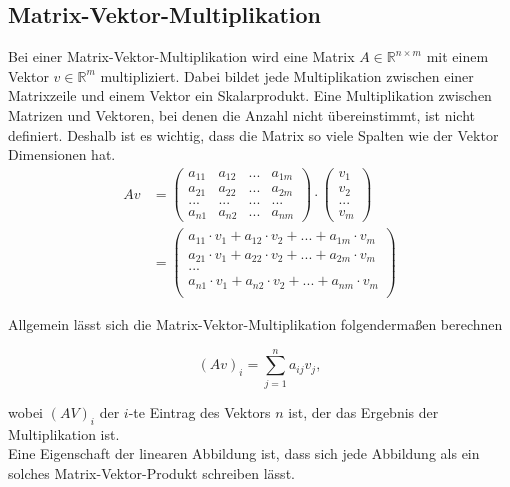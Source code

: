 \subsection{Matrix-Vektor-Multiplikation}
Bei einer Matrix-Vektor-Multiplikation wird eine Matrix $A \in  \mathbb{R}^{n \times m}$ mit einem Vektor $v \in \mathbb{R}^m$ multipliziert. Dabei bildet jede Multiplikation zwischen einer Matrixzeile und einem Vektor ein Skalarprodukt. Eine Multiplikation zwischen Matrizen und Vektoren, bei denen die Anzahl nicht übereinstimmt, ist nicht definiert. Deshalb ist es wichtig, dass die Matrix so viele Spalten wie der Vektor Dimensionen hat.
\begin{align*}
	Av &= 
	\left(
   \begin{array}{cccc}
	  a_{11} & a_{12} & ... & a_{1m}\\
		a_{21} & a_{22} & ... & a_{2m}\\
		...   & ...   & ... & ...  \\
		a_{n1} & a_{n2} & ... & a_{nm}
	 \end{array}
	\right) 
	\cdot 
	\left(
	 \begin{array}{c}
	  v_1\\
		v_2\\
		...\\
		v_m
	 \end{array}
	\right)\\
	&= \left(
	 \begin{array}{c}
	 a_{11} \cdot v_1 + a_{12} \cdot v_2 + ... + a_{1m} \cdot v_m\\
	 a_{21} \cdot v_1 + a_{22} \cdot v_2 + ... + a_{2m} \cdot v_m\\
		...\\
	 a_{n1} \cdot v_1 + a_{n2} \cdot v_2 + ... + a_{nm} \cdot v_m\\
	 \end{array}
	\right)
\end{align*}

Allgemein lässt sich die Matrix-Vektor-Multiplikation folgendermaßen berechnen

\begin{equation*}
(Av)_i = \sum_{j=1}^{n}a_{ij}v_j ,
\end{equation*}

wobei $(AV)_i$ der $i$-te Eintrag des Vektors $n$ ist, der das Ergebnis der Multiplikation ist.\\
Eine Eigenschaft der linearen Abbildung ist, dass sich jede Abbildung als ein solches Matrix-Vektor-Produkt schreiben lässt. 

